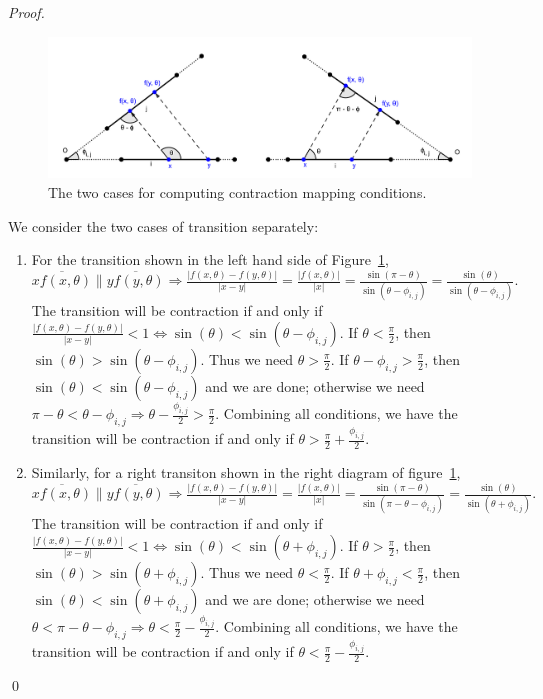 \documentclass[]{styles/svproc}  %
\begin{document}
\begin{appendix}
\begin{proof}
\begin{figure}
    \includegraphics[width=1\linewidth]{figures/contraction_map_cond.png}
    \centering
    \caption{The two cases for computing contraction mapping conditions. \label{fig:cont_map}}
    \centering
\end{figure}

We consider the two cases of transition separately:
\begin{enumerate}
    \item For the transition shown in the left hand side of Figure~\ref{fig:cont_map}, 
          $\overline{xf(x, \theta)} \parallel \overline{yf(y, \theta)} \Rightarrow \frac{|f(x, \theta)-f(y, \theta)|}{|x-y|} = \frac{|f(x, \theta)|}{|x|} = \frac{\sin(\pi - \theta)}{\sin(\theta - \phi_{i, j})} = \frac{\sin(\theta)}{\sin(\theta-\phi_{i, j})}.$ The transition will be contraction if and only if $\frac{|f(x, \theta)-f(y, \theta)|}{|x-y|} < 1 \iff \sin(\theta)<\sin(\theta-\phi_{i, j})$. If $\theta < \frac{\pi}{2}$, then $\sin(\theta) > \sin(\theta-\phi_{i, j})$. Thus we need $\theta>\frac{\pi}{2}$. If $\theta-\phi_{i, j} > \frac{\pi}{2}$, then $\sin(\theta) < \sin(\theta-\phi_{i, j})$ and we are done; otherwise we need $\pi - \theta < \theta-\phi_{i, j} \Rightarrow \theta - \frac{\phi_{i, j}}{2} > \frac{\pi}{2}$. Combining all conditions, we have the transition will be contraction if and only if $\theta >\frac{\pi}{2} + \frac{\phi_{i, j}}{2}$.
    \item Similarly, for a right transiton shown in the right diagram of figure~\ref{fig:cont_map}, $\overline{xf(x, \theta)} \parallel \overline{yf(y, \theta)} \Rightarrow \frac{|f(x, \theta)-f(y, \theta)|}{|x-y|} = \frac{|f(x, \theta)|}{|x|} = \frac{\sin(\pi - \theta)}{\sin(\pi -\theta-\phi_{i, j})} = \frac{\sin(\theta)}{\sin(\theta + \phi_{i, j})}.$ The transition will be contraction if and only if $\frac{|f(x, \theta)-f(y, \theta)|}{|x-y|} < 1 \iff \sin(\theta)<\sin(\theta+\phi_{i, j})$. If $\theta  > \frac{\pi}{2}$, then $\sin(\theta) > \sin(\theta + \phi_{i, j})$. Thus we need $\theta<\frac{\pi}{2}$. If $\theta+\phi_{i, j} < \frac{\pi}{2}$, then $\sin(\theta) < \sin(\theta+\phi_{i, j})$ and we are done; otherwise we need $\theta < \pi-\theta-\phi_{i, j} \Rightarrow \theta < \frac{\pi}{2} - \frac{\phi_{i, j}}{2}$. Combining all conditions, we have the transition will be contraction if and only if $\theta <\frac{\pi}{2} - \frac{\phi_{i, j}}{2}$.
\end{enumerate}
\qed


\end{proof}
\end{appendix}
\end{document}
